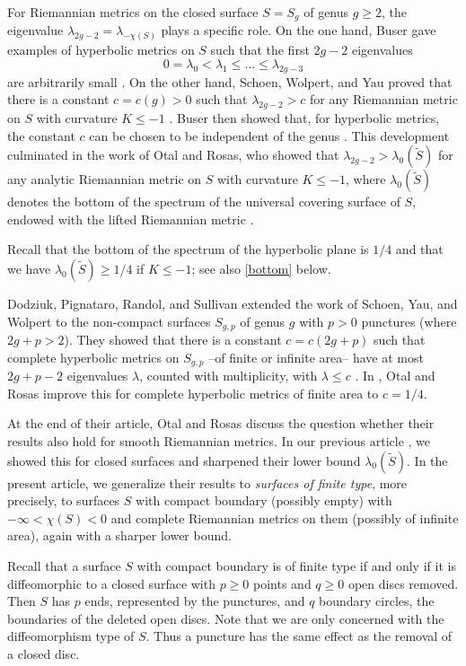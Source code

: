 For Riemannian metrics on the closed surface $S=S_g$ of genus $g\ge2$,
the eigenvalue $\lambda_{2g-2}=\lambda_{-\chi(S)}$ plays a specific role.
On the one hand, Buser gave examples of hyperbolic metrics
on $S$ such that the first $2g-2$ eigenvalues
\begin{equation*}
  0 = \lambda_0 < \lambda_1 \le \dots \le \lambda_{2g-3}
\end{equation*}
are arbitrarily small \cite[Satz 1]{Bu1}.
On the other hand, Schoen, Wolpert, and Yau proved that there is a
constant $c=c(g)>0$ such that $\lambda_{2g-2} > c$
for any Riemannian metric on $S$ with curvature $K\le-1$ \cite{SWY}.
Buser then showed that, for hyperbolic metrics, the constant $c$
can be chosen to be independent of the genus \cite[Theorem 8.1.4]{Bu2}.
This development culminated in the work of Otal and Rosas,
who showed that $\lambda_{2g-2}>\lambda_0(\tilde S)$
for any analytic Riemannian metric on $S$ with curvature $K\le-1$,
where $\lambda_0(\tilde S)$ denotes the bottom of the spectrum
of the universal covering surface of $S$,
endowed with the lifted Riemannian metric \cite[Th\'eor\`eme 1]{OR}.

Recall that the bottom of the spectrum of the hyperbolic plane is $1/4$
and that we have $\lambda_0(\tilde S)\ge1/4$ if $K\le-1$;
see also \eqref{bottom} below.

Dodziuk, Pignataro, Randol, and Sullivan extended the work of Schoen, Yau, and Wolpert
to the non-compact surfaces $S_{g,p}$ of genus $g$ with $p>0$ punctures
(where $2g+p>2$).
They showed that there is a constant $c=c(2g+p)$ such that complete hyperbolic
metrics on $S_{g,p}$ --of finite or infinite area--
have at most $2g+p-2$ eigenvalues $\lambda$, counted with multiplicity,
with $\lambda\le c$ \cite[Corollary 1.3]{DPRS}.
In \cite[Th\'eor\`eme 2]{OR},
Otal and Rosas improve this for complete hyperbolic metrics of finite area to $c=1/4$. 

At the end of their article, Otal and Rosas discuss the question
whether their results also hold for smooth Riemannian metrics.
In our previous article \cite{BMM}, we showed this for closed surfaces
and sharpened their lower bound $\lambda_0(\tilde S)$. 
In the present article, we generalize their results
to \emph{surfaces of finite type}, more precisely, to surfaces $S$
with compact boundary (possibly empty) with $-\infty<\chi(S)<0$
and complete Riemannian metrics on them (possibly of infinite area),
again with a sharper lower bound.

Recall that a surface $S$ with compact boundary is of finite type if and only if
it is diffeomorphic to a closed surface with $p\ge0$ points and $q\ge0$ open discs removed.
Then $S$ has $p$ ends, represented by the punctures,
and $q$ boundary circles, the boundaries of the deleted open discs.
Note that we are only concerned with the diffeomorphism type of $S$.
Thus a puncture has the same effect as the removal of a closed disc.

